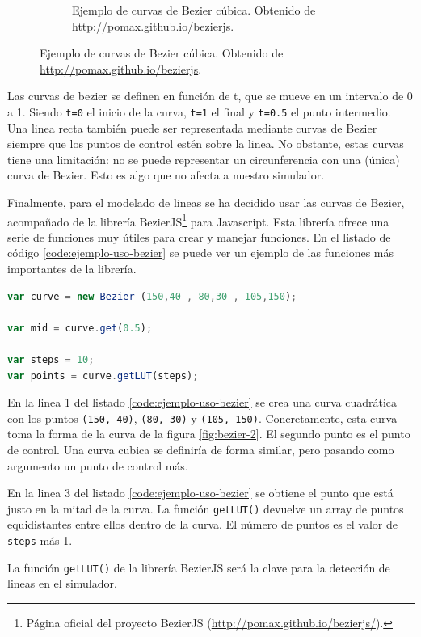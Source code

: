 \begin{figure}[!ht]
\begin{adjustwidth}{\oddsidemargin-1in}{\rightmargin}
\begin{subfigure}{\paperwidth}
	\caption{Ejemplo de curvas de Bezier cúbica. Obtenido de \url{http://pomax.github.io/bezierjs}.}				
				\label{fig:bezier-3}
			\end{subfigure}
	\end{adjustwidth}
\end{figure}


Las curvas de bezier se definen en función de t, que se mueve en un intervalo de 0 a 1. Siendo \texttt{t=0} el inicio de la curva, \texttt{t=1} el final y \texttt{t=0.5} el punto intermedio. Una linea recta también puede ser representada mediante curvas de Bezier siempre que los puntos de control estén sobre la linea. No obstante, estas curvas tiene una limitación: no se puede representar un circunferencia con una (única) curva de Bezier. Esto es algo que no afecta a nuestro simulador.

Finalmente, para el modelado de lineas se ha decidido usar las curvas de Bezier, acompañado de la librería BezierJS\footnote{Página oficial del proyecto BezierJS (\url{http://pomax.github.io/bezierjs/}).} para Javascript. Esta librería ofrece una serie de funciones muy útiles para crear y manejar funciones. En el listado de código \ref{code:ejemplo-uso-bezier} se puede ver un ejemplo de las funciones más importantes de la librería. 

\begin{lstlisting}[language={Javascript},label={code:ejemplo-uso-bezier}, caption={Ejemplo de uso de las funciones de la librería BezierJS.}]
var curve = new Bezier (150,40 , 80,30 , 105,150);

var mid = curve.get(0.5);

var steps = 10;
var points = curve.getLUT(steps);
\end{lstlisting}

En la linea 1 del listado \ref{code:ejemplo-uso-bezier} se crea una curva cuadrática con los puntos \texttt{(150, 40)}, \texttt{(80, 30)} y \texttt{(105, 150)}. Concretamente, esta curva toma la forma de la curva de la figura \ref{fig:bezier-2}. El segundo punto es el punto de control. Una curva cubica se definiría de forma similar, pero pasando como argumento un punto de control más. 

En la linea 3 del listado \ref{code:ejemplo-uso-bezier} se obtiene el punto que está justo en la mitad de la curva. La función \texttt{getLUT()} devuelve un array de puntos equidistantes entre ellos dentro de la curva. El número de puntos es el valor de \texttt{steps} más 1.

La función \texttt{getLUT()} de la librería BezierJS será la clave para la detección de lineas en el simulador.


